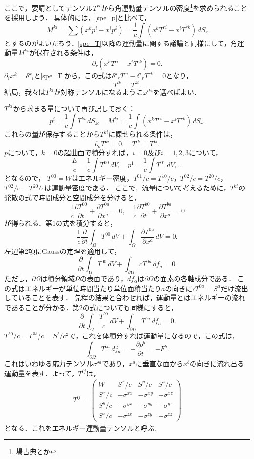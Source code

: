 \documentclass[a4paper]{ltjsreport}
\begin{document}
ここで，要請としてテンソル$T^{ki}$から角運動量テンソルの密度\footnote{場古典とか}を求められることを採用しよう．
具体的には，\eqref{spe_p}と比べて，
\[ M^{ki}=\sum\left(x^kp^i - x^ip^k\right)=\frac{1}{c}\int\left(x^kT^{ri} - x^iT^{rk}\right)\,dS_r \]
とするのがよいだろう．\eqref{spe_T}以降の運動量に関する議論と同様にして，角運動量$M^{ki}$が保存される条件は，
\[ \partial_r\left(x^kT^{ri} - x^iT^{rk}\right) = 0 . \]
$\partial_ix^k={\delta^k}_i$と\eqref{spe_T}から，この式は${\delta^k}_rT^{ri} - {\delta^i}_rT^{rk} = 0$となり，
\[ T^{ik} = T^{ki} . \]
結局，我々は$T^{ki}$が対称テンソルになるように$\varphi^{lki}$を選べばよい．

$T^{ki}$から求まる量について再び記しておく：
\[ p^i=\frac{1}{c}\int{T^{ki}}\,dS_k,\quad{}M^{ki}=\frac{1}{c}\int\left(x^kT^{ri} - x^iT^{rk}\right)\,dS_r. \]
これらの量が保存することから$T^{ki}$に課せられる条件は，
\[ \partial_k{T^{ki}}=0,\quad{}T^{ik}=T^{ki}. \]
$p$について，$k=0$の超曲面で積分すれば，$i=0$及び$i=1,2,3$について，
\[\frac{E}{c}=\frac{1}{c}\int{T^{00}}\,dV,\quad{}p^1=\frac{1}{c}\int{T^{01}}\,dV,\ldots\]
となるので，
$T^{00}=W$はエネルギー密度，$T^{01}/c=T^{10}/c$，$T^{02}/c=T^{20}/c$，$T^{02}/c=T^{20}/c$は運動量密度である．
ここで，流量について考えるために，$T^{ki}$の発散の式で時間成分と空間成分を分けると，
\[
\frac{1}{c}\frac{\partial{T^{00}}}{\partial{t}} + \frac{\partial{T^{0a}}}{\partial{x^a}}=0 , \quad
\frac{1}{c}\frac{\partial{T^{b0}}}{\partial{t}} + \frac{\partial{T^{ba}}}{\partial{x^a}}=0
\]
が得られる．第1の式を積分すると，
\[ \frac{1}{c}\frac{\partial}{\partial{t}}\int_{\Omega}{T^{00}}\,dV + \int_{\Omega}\frac{\partial{T^{0a}}}{\partial{x^a}}\,dV = 0 . \]
左辺第2項にGaussの定理を適用して，
\[ \frac{\partial}{\partial{t}}\int_{\Omega}{T^{00}}\,dV + \int_{\partial\Omega}cT^{0a}\,df_a = 0 . \]
ただし，$\partial\Omega$は積分領域$\Omega$の表面であり，$df_\alpha$は$\partial\Omega$の面素の各軸成分である．
この式はエネルギーが単位時間当たり単位面積当たり$a$の向きに$cT^{0a}=S^a$だけ流出していることを表す．
先程の結果と合わせれば，運動量とはエネルギーの流れであることが分かる．第2の式についても同様にすると，
\[ \frac{\partial}{\partial{t}}\int_{\Omega}\frac{T^{b0}}{c}{}\,dV + \int_{\partial\Omega}T^{ba}\,df_a=0 . \]
$T^{b0}/c=T^{0b}/c=S^b/c^2$で，これを体積分すれば運動量になるので，この式は，
\[ \int_{\partial\Omega}T^{ba}\,df_a= - \frac{\partial{}p^b}{\partial{t}} = - F^{b} . \]
これはいわゆる応力テンソル$\sigma^{ba}$であり，$x^a$に垂直な面から$x^b$の向きに流れ出る運動量を表す．よって，$T^{ij}$は，
\begin{align}
  T^{ij}=
  \begin{pmatrix}
    W & {S^x}/{c} & {S^y}/{c} & {S^z}/{c}\\
    {S^x}/{c} &  - \sigma^{xx} &  - \sigma^{xy} &  - \sigma^{xz}\\
    {S^y}/{c} &  - \sigma^{yx} &  - \sigma^{yy} &  - \sigma^{yz}\\
    {S^z}/{c} &  - \sigma^{zx} &  - \sigma^{zy} &  - \sigma^{zz}
  \end{pmatrix}
\end{align}
となる．これをエネルギー運動量テンソルと呼ぶ．
\end{document}
